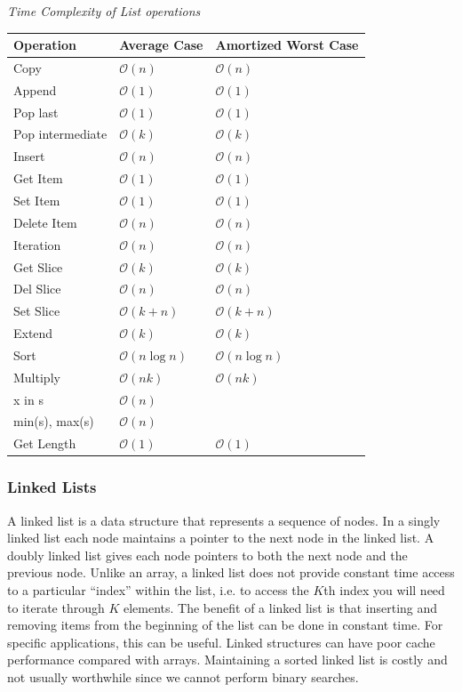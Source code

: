 \documentclass{article}
\newcommand{\bigO}{\mathcal{O}}
\begin{document}
    \vspace{8pt} \emph{Time Complexity of List operations}
    \begin{table}[H]
        \begin{tabular}{|l|l|l|}
            \hline
            \textbf{Operation} & \textbf{Average Case} & \textbf{Amortized Worst Case} \\
            \hline
            Copy & $\bigO(n)$ & $\bigO(n)$ \\
            Append & $\bigO(1)$ & $\bigO(1)$\\
            Pop last & $\bigO(1)$ & $\bigO(1)$ \\
            Pop intermediate & $\bigO(k)$ & $\bigO(k)$ \\
            Insert & $\bigO(n)$ & $\bigO(n)$ \\
            Get Item & $\bigO(1)$ & $\bigO(1)$ \\
            Set Item & $\bigO(1)$ & $\bigO(1)$ \\
            Delete Item & $\bigO(n)$ & $\bigO(n)$ \\
            Iteration & $\bigO(n)$ & $\bigO(n)$ \\
            Get Slice & $\bigO(k)$ & $\bigO(k)$\\
            Del Slice & $\bigO(n)$ & $\bigO(n)$ \\
            Set Slice & $\bigO(k+n)$ & $\bigO(k+n)$\\
            Extend & $\bigO(k)$ & $\bigO(k)$\\
            Sort & $\bigO(n\log n)$ &$\bigO(n\log n)$\\
            Multiply & $\bigO(nk)$ & $\bigO(nk)$ \\
            x in s & $\bigO(n)$ &  \\
            min(s), max(s) & $\bigO(n)$ & \\
            Get Length & $\bigO(1)$ & $\bigO(1)$ \\
            \hline
        \end{tabular}
    \end{table}

    
    \subsubsection{Linked Lists}
    A linked list is a data structure that represents a sequence of nodes. In a singly linked list each node maintains a pointer to the next node in the linked list. A doubly linked list gives each node pointers to both the next node and the previous node. Unlike an array, a linked list does not provide constant time access to a particular ``index'' within the list, i.e. to access the $K$th index you will need to iterate through $K$ elements. The benefit of a linked list is that inserting and removing items from the beginning of the list can be done in constant time. For specific applications, this can be useful. Linked structures can have poor cache performance compared with arrays. Maintaining a sorted linked list is costly and not usually worthwhile since we cannot perform binary searches.
\end{document}

